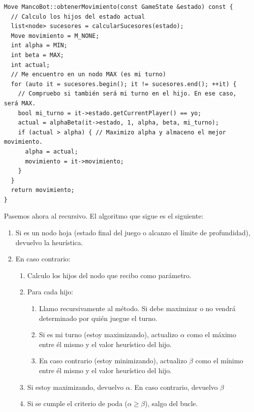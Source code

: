 \documentclass[12pt,spanish]{article}
\begin{document}
\begin{verbatim}
Move MancoBot::obtenerMovimiento(const GameState &estado) const {
  // Calculo los hijos del estado actual
  list<node> sucesores = calcularSucesores(estado);
  Move movimiento = M_NONE;
  int alpha = MIN;
  int beta = MAX;
  int actual;
  // Me encuentro en un nodo MAX (es mi turno)
  for (auto it = sucesores.begin(); it != sucesores.end(); ++it) {
    // Compruebo si también será mi turno en el hijo. En ese caso, será MAX.
    bool mi_turno = it->estado.getCurrentPlayer() == yo;
    actual = alphaBeta(it->estado, 1, alpha, beta, mi_turno);
    if (actual > alpha) { // Maximizo alpha y almaceno el mejor movimiento.
      alpha = actual;
      movimiento = it->movimiento;
    }
  }
  return movimiento;
}
\end{verbatim}



Pasemos ahora al recursivo. El algoritmo que sigue es el siguiente:

\begin{enumerate}
	\item Si es un nodo hoja (estado final del juego o alcanzo el límite de profundidad), devuelvo la heurística.
	\item En caso contrario:
		\begin{enumerate}[label=2.\arabic*]
			\item Calculo los hijos del nodo que recibo como parámetro.
			\item Para cada hijo:
				\begin{enumerate}[label=2.2.\arabic*]
					\item Llamo recursivamente al método. Si debe maximizar o no vendrá determinado por quién juegue el turno.
					\item Si es mi turno (estoy maximizando), actualizo $\alpha$ como el máximo entre él mismo y el valor heurístico del hijo.
					\item En caso contrario (estoy minimizando), actualizo $\beta$ como el mínimo entre él mismo y el valor heurístico del hijo.
				\end{enumerate}
			\item Si estoy maximizando, devuelvo $\alpha$. En caso contrario, devuelvo $\beta$
			\item Si se cumple el criterio de poda ($\alpha \geq \beta$), salgo del bucle.
		\end{enumerate}
\end{enumerate}
\end{document}
